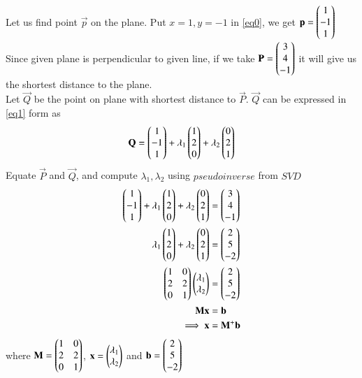 \documentclass[journal,12pt,twocolumn]{IEEEtran}
\begin{document}
Let us find point $\vec{p}$ on the plane. Put $x=1,y=-1$ in \eqref{eq0}, we get $\mathbf{p} = \begin{pmatrix}1\\-1\\1\end{pmatrix}$\\
Since given plane is perpendicular to given line, if we take $\mathbf{P} = \begin{pmatrix}3 \\ 4 \\ -1\end{pmatrix}$ it will give us the shortest distance to the plane. \\
Let $\vec{Q}$ be the point on plane with shortest distance to $\vec{P}$. $\vec{Q}$ can be expressed in \eqref{eq1} form as
\begin{align}\label{eq3}
	\mathbf{Q} = \begin{pmatrix}1\\-1\\1\end{pmatrix} + \lambda_1\begin{pmatrix}1\\2\\0\end{pmatrix} + \lambda_2\begin{pmatrix}0\\2\\1\end{pmatrix}
\end{align}
Equate $\vec{P}$ and $\vec{Q}$, and compute $\lambda_1, \lambda_2$ using $\textit{pseudoinverse}$ from $\textit{SVD}$
\begin{align}
	\begin{pmatrix}1\\-1\\1\end{pmatrix} + \lambda_1\begin{pmatrix}1\\2\\0\end{pmatrix} + \lambda_2\begin{pmatrix}0\\2\\ 1\end{pmatrix} &= \begin{pmatrix}3\\4\\-1\end{pmatrix}\\
	\lambda_1\begin{pmatrix}1\\2\\0\end{pmatrix} + \lambda_2\begin{pmatrix}0\\2\\ 1\end{pmatrix} &= \begin{pmatrix}2\\5\\-2\end{pmatrix}\\
	\label{eq4}\begin{pmatrix}1 & 0\\2 & 2\\0 & 1\end{pmatrix} \begin{pmatrix}\lambda_1 \\ \lambda_2\end{pmatrix} &=\begin{pmatrix}2\\5\\-2\end{pmatrix}\\
	\label{eq5}\mathbf{M}\mathbf{x} &= \mathbf{b}\\
	\label{eq6}\implies\mathbf{x} &= \mathbf{M}^{+}\mathbf{b}
\end{align}
where $\mathbf{M} = \begin{pmatrix}1 & 0\\2 & 2\\0 & 1\end{pmatrix}$, $\mathbf{x}= \begin{pmatrix}\lambda_1 \\ \lambda_2\end{pmatrix}$ and $\mathbf{b}=\begin{pmatrix}2\\5\\-2\end{pmatrix}$
\end{document}
